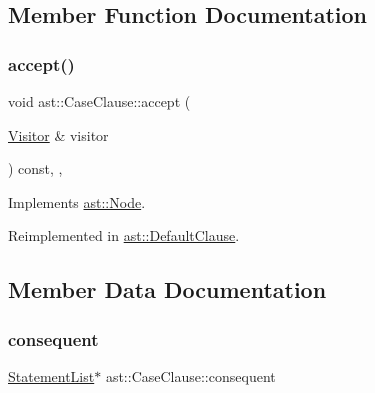 \subsection{Member Function Documentation}
\mbox{\label{structast_1_1_case_clause_a070bb52dc711dc7272ab8d2496631723}} 
\subsubsection{\texorpdfstring{accept()}{accept()}}
{\footnotesize\ttfamily void ast\+::\+Case\+Clause\+::accept (\begin{DoxyParamCaption}\item[{\hyperlink{structast_1_1_visitor}{Visitor} \&}]{visitor }\end{DoxyParamCaption}) const\hspace{0.3cm}{\ttfamily [inline]}, {\ttfamily [override]}, {\ttfamily [virtual]}}



Implements \hyperlink{structast_1_1_node_abc089ee6caaf06a4445ebdd8391fdebc}{ast\+::\+Node}.



Reimplemented in \hyperlink{structast_1_1_default_clause_a9a96288d67e4e058c860d094f6a5e3a8}{ast\+::\+Default\+Clause}.



\subsection{Member Data Documentation}
\mbox{\label{structast_1_1_case_clause_ad858f522c59ec1fe025067c1799df288}} 
\subsubsection{\texorpdfstring{consequent}{consequent}}
{\footnotesize\ttfamily \hyperlink{structast_1_1_statement_list}{Statement\+List}$\ast$ ast\+::\+Case\+Clause\+::consequent}

\mbox{\label{structast_1_1_case_clause_aee3633f283d925ec229674d09970b4b9}} 
